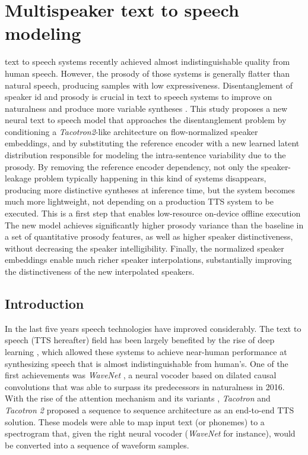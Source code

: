 \chapter{Multispeaker text to speech modeling} \label{ch:tts}

text to speech systems recently achieved almost indistinguishable quality from human speech. However, the prosody of those systems is generally flatter than natural speech, producing samples with low expressiveness. Disentanglement of speaker id and prosody is crucial in text to speech systems to improve on naturalness and produce more variable syntheses \autocite{markovi2015}. This study proposes a new neural text to speech model that approaches the disentanglement problem by conditioning a \textit{Tacotron2}-like architecture on flow-normalized speaker embeddings, and by substituting the reference encoder with a new learned latent distribution responsible for modeling the intra-sentence variability due to the prosody. By removing the reference encoder dependency, not only the speaker-leakage problem typically happening in this kind of systems disappears, producing more distinctive syntheses at inference time, but the system becomes much more lightweight, not depending on a production TTS system to be executed. This is a first step that enables low-resource on-device offline execution The new model achieves significantly higher prosody variance than the baseline in a set of quantitative prosody features, as well as higher speaker distinctiveness, without decreasing the speaker intelligibility. Finally, the normalized speaker embeddings enable much richer speaker interpolations, substantially improving the distinctiveness of the new interpolated speakers.


\section{Introduction}
In the last five years speech technologies have improved considerably. The text to speech (TTS hereafter) field has been largely benefited by the rise of deep learning \autocite{Sisman2021}, which allowed these systems to achieve near-human performance at synthesizing speech that is almost indistinguishable from human's. One of the first achievements was \textit{WaveNet} \autocite{vanderoord2016}, a neural vocoder based on dilated causal convolutions that was able to surpass its predecessors in naturalness in 2016. With the rise of the attention mechanism and its variants \autocite{bahdanau2015,vaswani2017,chaudhari2019}, \textit{Tacotron} \autocite{Wang2017} and \textit{Tacotron 2} \autocite{Shen2018,liu2019b} proposed a sequence to sequence architecture as an end-to-end TTS solution. These models were able to map input text (or phonemes) to a spectrogram that, given the right neural vocoder (\textit{WaveNet} for instance), would be converted into a sequence of waveform samples.

